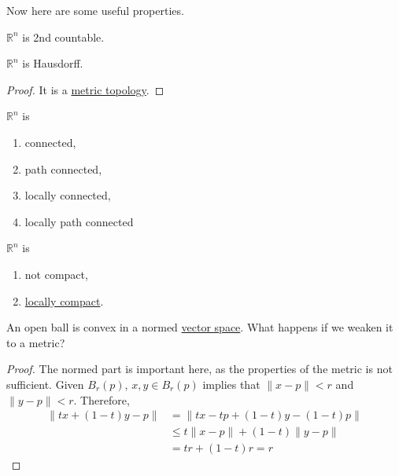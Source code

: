   Now here are some useful properties. 

  \begin{theorem}[Countability]
    \label{thm:countability}
    $\mathbb{R}^n$ is 2nd countable. 
  \end{theorem}

  \begin{theorem}[Separability]
    \label{thm:separability}
    $\mathbb{R}^n$ is Hausdorff. 
  \end{theorem}
  \begin{proof}
    It is a \hyperref[pst-def:metric-topology]{metric topology}. 
  \end{proof}

  \begin{theorem}[Connectedness]
    \label{thm:connectedness}
    $\mathbb{R}^n$ is 
    \begin{enumerate}
      \item connected, 
      \item path connected, 
      \item locally connected, 
      \item locally path connected
    \end{enumerate}
  \end{theorem}

  \begin{theorem}[Compactness]
    \label{thm:compactness}
    $\mathbb{R}^n$ is 
    \begin{enumerate}
      \item not compact, 
      \item \hyperref[pst-def:locally-compact]{locally compact}. 
    \end{enumerate}
  \end{theorem}

  \begin{theorem}[Convexity]
    \label{thm:convexity}
    An open ball is convex in a normed \hyperref[lin-def:vector-space]{vector space}. What happens if we weaken it to a metric? 
  \end{theorem}
  \begin{proof}
    The normed part is important here, as the properties of the metric is not sufficient. Given $B_r (p)$, $x, y \in B_r (p)$ implies that $\|x - p\| < r$ and $\|y - p \|<r$. Therefore, 
    \begin{align}
      \|t x + (1 - t)y - p\| & = \|t x - tp + (1 - t) y - (1 - t) p\| \\
      & \leq t \|x - p\| + (1 - t) \|y - p\| \\
      & = t r + (1 - t) r = r 
    \end{align}
  \end{proof}

